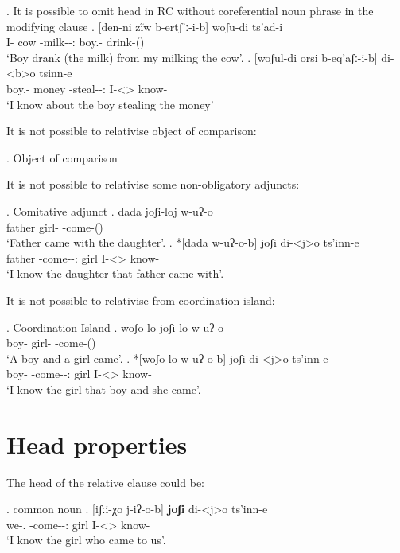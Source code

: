 \ex. It is possible to omit head in RC without coreferential noun phrase in the modifying clause
	\ag. [den-ni zĩw b-ertʃ'ː-i-b] woʃu-di ts'ad-i\\
			{I-\Erg} cow {\An-milk-\Pst-\Ptcp:\Pst} {boy.\Obl-\Erg} {drink-\Pst(\Aor)}\\
			\glt `Boy drank (the milk) from my milking the cow'.
	\bg. [woʃul-di orsi b-eq'aʃː-i-b] di-<b>o tsinn-e\\
			{boy.\Obl-\Erg} money {\Nanf-steal-\Pst-\Ptcp:\Pst} {I-<\Nanf>\Aff} {know-\Hab}\\
			\glt `I know about the boy stealing the money'			 
			 
It is not possible to relativise object of comparison:

\ex. Object of comparison
			 
It is not possible to relativise some non-obligatory adjuncts:

\ex. Comitative adjunct
	\ag. dada joʃi-loj w-uʔ-o\\
			father {girl-\Com} {\M-come-\Pst(\Aor)}\\
			\glt `Father came with the daughter'.	
	\bg. *[dada w-uʔ-o-b] joʃi di-<j>o ts'inn-e\\
			father {\M-come-\Pst-\Ptcp:\Pst} girl {I-<\F>\Aff} {know-\Hab}\\
			\glt `I know the daughter that father came with'.

It is not possible to relativise from coordination island:

\ex. Coordination Island
	\ag. woʃo-lo joʃi-lo w-uʔ-o\\
			{boy-\Addi} {girl-\Addi} {\M-come-\Pst(\Aor)}\\
			\glt `A boy and a girl came'.	
	\bg. *[woʃo-lo w-uʔ-o-b] joʃi di-<j>o ts'inn-e\\
			{boy-\Addi} {\M-come-\Pst-\Ptcp:\Pst} girl {I-<\F>\Aff} {know-\Hab}\\
			\glt `I know the girl that boy and she came'.

\section{Head properties}
The head of the relative clause could be:

\ex. common noun
	\ag. [iʃːi-χo j-iʔ-o-b] \textbf{joʃi} di-<j>o ts'inn-e \\
		  {we-\Add.\Lat} {\F-come-\Pst-\Ptcp:\Pst} {girl} {I-<\F>\Aff} {know-\Hab}\\
		 \glt    `I know the girl who came to us'.

